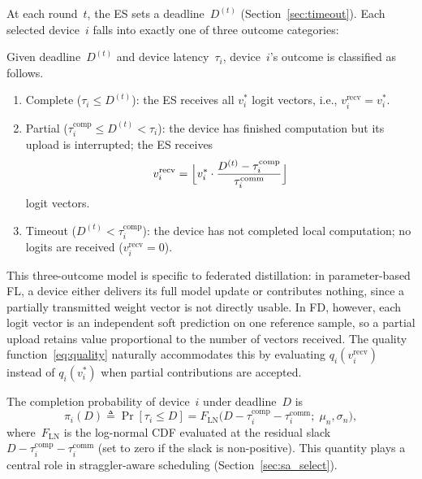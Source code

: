 \documentclass[a4paper,fleqn]{cas-dc}
\begin{document}
	At each round~$t$, the ES sets a deadline~$D^{(t)}$
	(Section~\ref{sec:timeout}).  Each selected device~$i$ falls into
	exactly one of three outcome categories:
	
	\begin{definition}\label{def:outcome}
		Given deadline~$D^{(t)}$ and device latency~$\tau_i$, device~$i$'s
		outcome is classified as follows.
		\begin{enumerate}
			\item[(C)] Complete ($\tau_i \leq D^{(t)}$): the ES receives all
			$v_i^*$ logit vectors, i.e., $v_i^{\mathrm{recv}} = v_i^*$.
			\item[(P)] Partial
			($\tau_i^{\mathrm{comp}} \leq D^{(t)} < \tau_i$): the device has
			finished computation but its upload is interrupted; the ES receives
			\begin{equation}\label{eq:partial}
				v_i^{\mathrm{recv}} = \Bigl\lfloor v_i^*
				\cdot \frac{D^{(t)} - \tau_i^{\mathrm{comp}}}
				{\tau_i^{\mathrm{comm}}} \Bigr\rfloor
			\end{equation}
			logit vectors.
			\item[(T)] Timeout ($D^{(t)} < \tau_i^{\mathrm{comp}}$): the device
			has not completed local computation; no logits are received
			($v_i^{\mathrm{recv}} = 0$).
		\end{enumerate}
	\end{definition}
	
	This three-outcome model is specific to federated distillation: in
	parameter-based FL, a device either delivers its full model update or
	contributes nothing, since a partially transmitted weight vector is
	not directly usable.  In FD, however, each logit vector is an
	independent soft prediction on one reference sample, so a partial
	upload retains value proportional to the number of vectors received.
	The quality function~\eqref{eq:quality} naturally accommodates this
	by evaluating $q_i(v_i^{\mathrm{recv}})$ instead of $q_i(v_i^*)$
	when partial contributions are accepted.
	
	The completion probability of device~$i$ under deadline~$D$ is
	\begin{equation}\label{eq:pi}
		\pi_i(D) \triangleq \Pr[\tau_i \leq D]
		= F_{\mathrm{LN}}\!\bigl(D - \tau_i^{\mathrm{comp}}
		- \tau_i^{\mathrm{comm}};\; \mu_n, \sigma_n\bigr),
	\end{equation}
	where~$F_{\mathrm{LN}}$ is the log-normal CDF evaluated at the
	residual slack $D - \tau_i^{\mathrm{comp}} - \tau_i^{\mathrm{comm}}$
	(set to zero if the slack is non-positive).  This quantity plays a
	central role in straggler-aware scheduling
	(Section~\ref{sec:sa_select}).
	
\end{document}
